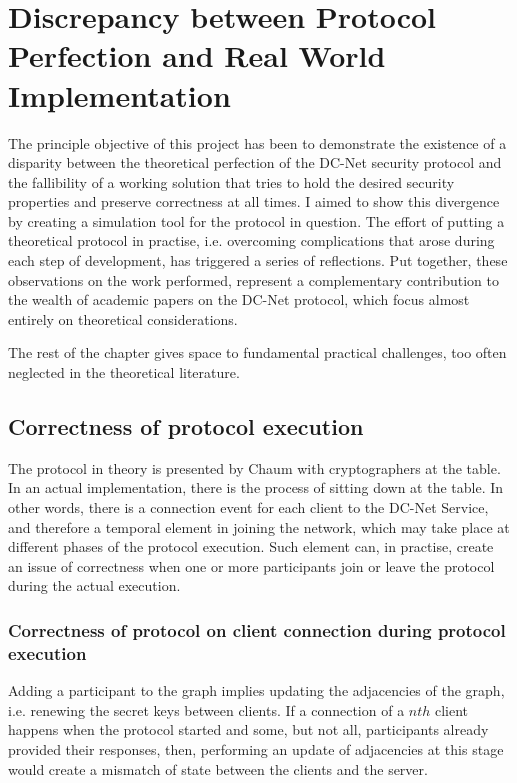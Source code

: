 \section{Discrepancy between Protocol Perfection and Real World Implementation}
The principle objective of this project has been to demonstrate the existence of a disparity between the theoretical perfection of the DC-Net security protocol and the fallibility of a working solution that tries to hold the desired security properties and preserve correctness at all times. I aimed to show this divergence by creating a simulation tool for the protocol in question. The effort of putting a theoretical protocol in practise, i.e. overcoming complications that arose during each step of development, has triggered a series of reflections. Put together, these observations on the work performed, represent a complementary contribution to the wealth of academic papers on the DC-Net protocol, which focus almost entirely on theoretical considerations. 

The rest of the chapter gives space to fundamental practical challenges, too often neglected in the theoretical literature.

\subsection{Correctness of protocol execution}
The protocol in theory is presented by Chaum with cryptographers at the table. In an actual implementation, there is the process of sitting down at the table. In other words, there is a connection event for each client to the DC-Net Service, and therefore a temporal element in joining the network, which may take place at different phases of the protocol execution. Such element can, in practise, create an issue of correctness when one or more participants join or leave the protocol during the actual execution.

\subsubsection{Correctness of protocol on client connection during protocol execution}
Adding a participant to the graph implies updating the adjacencies of the graph, i.e. renewing the secret keys between clients. If a connection of a $nth$ client happens when the protocol started and some, but not all, participants already provided their responses, then, performing an update of adjacencies at this stage would create a mismatch of state between the clients and the server.

